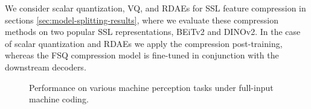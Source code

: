 \documentclass[10pt,twocolumn,letterpaper]{article}
\begin{document}
We consider scalar quantization, VQ, and RDAEs for SSL feature compression in sections \ref{sec:model-splitting-results}, where we evaluate these compression methods on two popular SSL representations, BEiTv2 and DINOv2. In the case of scalar quantization and RDAEs we apply the compression post-training, whereas the FSQ compression model is fine-tuned in conjunction with the downstream decoders. 



\begin{figure}
\begin{center}
\end{center}
\caption{\label{fig:mpq_results}%
Performance on various machine perception tasks under full-input machine coding.}
\end{figure}
\end{document}
